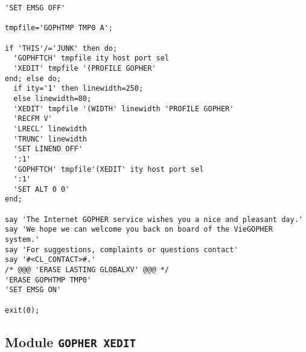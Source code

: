 \begin{verbatim}
'SET EMSG OFF'

tmpfile='GOPHTMP TMP0 A';

if 'THIS'/='JUNK' then do;
  'GOPHFTCH' tmpfile ity host port sel
  'XEDIT' tmpfile '(PROFILE GOPHER'
end; else do;
  if ity='1' then linewidth=250;
  else linewidth=80;
  'XEDIT' tmpfile '(WIDTH' linewidth 'PROFILE GOPHER'
  'RECFM V'
  'LRECL' linewidth
  'TRUNC' linewidth
  'SET LINEND OFF'
  ':1'
  'GOPHFTCH' tmpfile'(XEDIT' ity host port sel
  ':1'
  'SET ALT 0 0'
end;

say 'The Internet GOPHER service wishes you a nice and pleasant day.'
say 'We hope we can welcome you back on board of the VieGOPHER system.'
say 'For suggestions, complaints or questions contact'
say '#<CL_CONTACT>#.'
/* @@@ 'ERASE LASTING GLOBALXV' @@@ */
'ERASE GOPHTMP TMP0'
'SET EMSG ON'

exit(0);
\end{verbatim}

\subsection{Module {\tt GOPHER XEDIT}}

\def\LPtopD{Module {\tt GOPHER XEDIT}}

\def\LPtopF{~}

